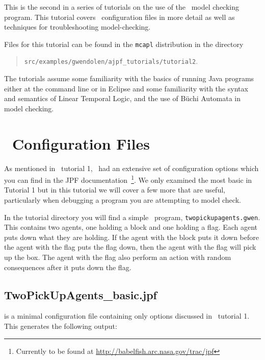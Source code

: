 
This is the second in a series of tutorials on the use of the \ajpf\ model checking program.  This tutorial covers \jpf\ configuration files in more detail as well as techniques for troubleshooting model-checking.

Files for this tutorial can be found in the \texttt{mcapl} distribution in the directory 
\begin{quote}
\texttt{src/examples/gwendolen/ajpf\_tutorials/tutorial2}.
\end{quote}

The tutorials assume some familiarity with the basics of running Java programs either at the command line or in Eclipse and some familiarity with the syntax and semantics of Linear Temporal Logic, and the use of B\"{u}chi Automata in model checking.

\section{\jpf\ Configuration Files}
As mentioned in \ajpf\ tutorial 1, \jpf\ had an extensive set of configuration options which you can find in the JPF documentation~\footnote{Currently to be found at \url{http://babelfish.arc.nasa.gov/trac/jpf}}. We only examined the most basic in Tutorial 1 but in this tutorial we will cover a few more that are useful, particularly when debugging a program you are attempting to model check.

In the tutorial directory you will find a simple \gwendolen\ program, \texttt{twopickupagents.gwen}.  This contains two agents, one holding a block and one holding a flag.  Each agent puts down what they are holding.  If the agent with the block puts it down before the agent with the flag puts the flag down, then the agent with the flag will pick up the box.  The agent with the flag also perform an action with random consequences after it puts down the flag.

\subsection{TwoPickUpAgents\_basic.jpf} is a minimal configuration file containing only options discussed in \ajpf\ tutorial 1.  This generates the following output:


